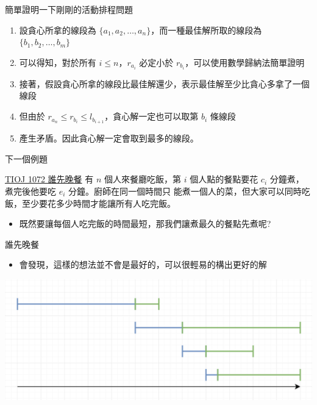 \documentclass[aspectratio=169]{beamer}
\begin{document}
    \begin{frame}{簡單證明一下剛剛的活動排程問題}
        \begin{enumerate}
            \item 設貪心所拿的線段為 $\{a_1,a_2,\dots,a_n\}$，而一種最佳解所取的線段為 $\{b_1,b_2,\dots,b_m\}$
            \item 可以得知，對於所有 $i \le n$，$r_{a_i}$ 必定小於 $r_{b_i}$，可以使用數學歸納法簡單證明
            \item 接著，假設貪心所拿的線段比最佳解還少，表示最佳解至少比貪心多拿了一個線段
            \item 但由於 $r_{a_n} \le r_{b_i} \le l_{b_{i+1}}$，貪心解一定也可以取第 $b_i$ 條線段
            \item 產生矛盾。因此貪心解一定會取到最多的線段。
        \end{enumerate}
    \end{frame}
    
    \begin{frame}{下一個例題}
        \begin{block}{\href{https://tioj.ck.tp.edu.tw/problems/1072}{TIOJ 1072 誰先晚餐}}
            有 $n$ 個人來餐廳吃飯，第 $i$ 個人點的餐點要花 $c_i$ 分鐘煮，煮完後他要吃 $e_i$ 分鐘。廚師在同一個時間只
            能煮一個人的菜，但大家可以同時吃飯，至少要花多少時間才能讓所有人吃完飯。
        \end{block}
        \begin{itemize}
            \item<2-> 既然要讓每個人吃完飯的時間最短，那我們讓煮最久的餐點先煮呢?
        \end{itemize}
    \end{frame}
    
    \begin{frame}{誰先晚餐}
        \begin{itemize}
            \item 會發現，這樣的想法並不會是最好的，可以很輕易的構出更好的解
        \end{itemize}
        \begin{center}
            \includegraphics[scale=0.5]{images/who_dinner_first.png}
        \end{center}
    \end{frame}
    
\end{document}
